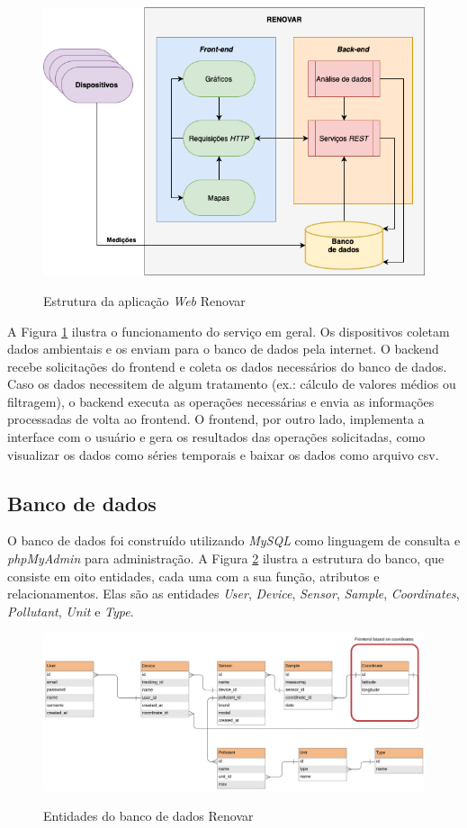 \begin{figure}[h]
    \centering
    \caption{Estrutura da aplicação \textit{Web} Renovar}
    \includegraphics[width=0.80\linewidth]{chapters//2-CLEAN/Figuras/Renovar Structure (PT).png}
    \label{fig:renovar-structure}
\end{figure}

A Figura \ref{fig:renovar-structure} ilustra o funcionamento do serviço em geral. Os dispositivos coletam dados ambientais e os enviam para o banco de dados pela internet. O backend recebe solicitações do frontend e coleta os dados necessários do banco de dados. Caso os dados necessitem de algum tratamento (ex.: cálculo de valores médios ou filtragem), o backend executa as operações necessárias e envia as informações processadas de volta ao frontend. O frontend, por outro lado, implementa a interface com o usuário e gera os resultados das operações solicitadas, como visualizar os dados como séries temporais e baixar os dados como arquivo \acrshort{csv}.

\subsection{Banco de dados}

O banco de dados foi construído utilizando \textit{MySQL} como linguagem de consulta e \textit{phpMyAdmin} para administração. A Figura \ref{fig:renovar-database} ilustra a estrutura do banco, que consiste em oito entidades, cada uma com a sua função, atributos e relacionamentos. Elas são as entidades \textit{User}, \textit{Device}, \textit{Sensor}, \textit{Sample}, \textit{Coordinates}, \textit{Pollutant}, \textit{Unit} e \textit{Type}.

\begin{figure}[h]
    \centering
    \caption{Entidades do banco de dados Renovar}
    \includegraphics[width=0.80\linewidth]{chapters//2-CLEAN/Figuras/Renovar Database.png}
    \label{fig:renovar-database}
\end{figure}

